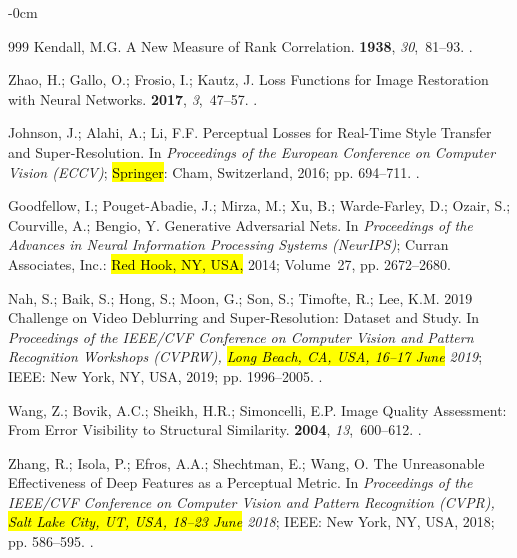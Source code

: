 \documentclass[symmetry,article,accept,pdftex,moreauthors]{Definitions/mdpi}
\begin{document}
\begin{adjustwidth}{-\extralength}{0cm}
\begin{thebibliography}{999}
Kendall, M.G.
\newblock A New Measure of Rank Correlation.
 {\bf 1938}, {\em 30},~81--93.
.

Zhao, H.; Gallo, O.; Frosio, I.; Kautz, J.
\newblock Loss Functions for Image Restoration with Neural Networks.
 {\bf 2017}, {\em
  3},~47--57.
.

Johnson, J.; Alahi, A.; Li, F.F.
\newblock Perceptual Losses for Real-Time Style Transfer and Super-Resolution.
\newblock In \emph{Proceedings of the European Conference on Computer Vision (ECCV)}; \hl{Springer}:
  Cham, Switzerland,  2016; pp. 694--711.
.

Goodfellow, I.; Pouget-Abadie, J.; Mirza, M.; Xu, B.; Warde-Farley, D.; Ozair,
  S.; Courville, A.; Bengio, Y.
\newblock Generative Adversarial Nets.
\newblock In \emph{Proceedings of the Advances in Neural Information Processing
  Systems (NeurIPS)}; Curran Associates, Inc.: \hl{Red Hook, NY, USA,}  2014; Volume~27, pp. 2672--2680.

Nah, S.; Baik, S.; Hong, S.; Moon, G.; Son, S.; Timofte, R.; Lee, K.M.
 2019 Challenge on Video Deblurring and Super-Resolution:
  Dataset and Study.
\newblock In \emph{Proceedings of the IEEE/CVF Conference on Computer Vision and
  Pattern Recognition Workshops (CVPRW), \hl{Long Beach, CA, USA, 16--17 June} 2019}; IEEE: New York, NY, USA,  2019; pp.
  1996--2005.
.

Wang, Z.; Bovik, A.C.; Sheikh, H.R.; Simoncelli, E.P.
\newblock Image Quality Assessment: From Error Visibility to Structural
  Similarity.
 {\bf 2004}, {\em
  13},~600--612.
.

Zhang, R.; Isola, P.; Efros, A.A.; Shechtman, E.; Wang, O.
\newblock The Unreasonable Effectiveness of Deep Features as a Perceptual
  Metric.
\newblock In \emph{Proceedings of the IEEE/CVF Conference on Computer Vision and
  Pattern Recognition (CVPR), \hl{Salt Lake City, UT, USA, 18--23 June} 2018}; IEEE: New York, NY, USA,  2018; pp. 586--595.
.


\end{thebibliography}
\end{adjustwidth}
\end{document}
